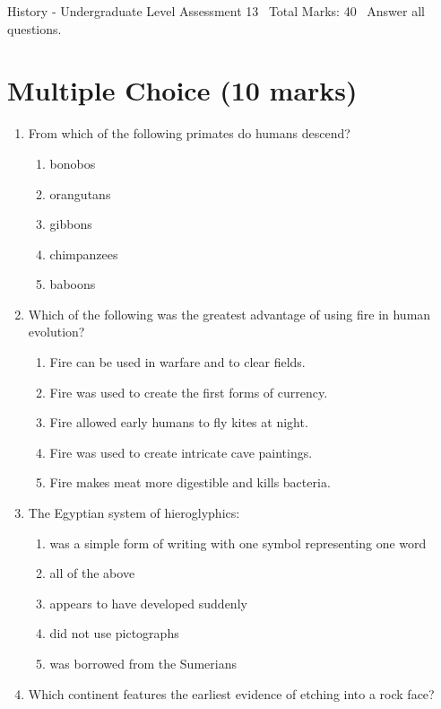 \documentclass[12pt]{article}
\begin{document}
\begin{center}
History - Undergraduate Level Assessment 13 \
Total Marks: 40 \
Answer all questions.
\end{center}

\section*{Multiple Choice (10 marks)}
\begin{enumerate}[label=\arabic*.]
\item From which of the following primates do humans descend?
\begin{enumerate}[label=(\alph*)]
    \item bonobos
    \item orangutans
    \item gibbons
    \item chimpanzees
    \item baboons
\end{enumerate}
\item Which of the following was the greatest advantage of using fire in human evolution?
\begin{enumerate}[label=(\alph*)]
    \item Fire can be used in warfare and to clear fields.
    \item Fire was used to create the first forms of currency.
    \item Fire allowed early humans to fly kites at night.
    \item Fire was used to create intricate cave paintings.
    \item Fire makes meat more digestible and kills bacteria.
\end{enumerate}
\item The Egyptian system of hieroglyphics:
\begin{enumerate}[label=(\alph*)]
    \item was a simple form of writing with one symbol representing one word
    \item all of the above
    \item appears to have developed suddenly
    \item did not use pictographs
    \item was borrowed from the Sumerians
\end{enumerate}
\item Which continent features the earliest evidence of etching into a rock face?
\begin{enumerate}[label=(\alph*)]

\end{enumerate}
\end{enumerate}
\end{document}
